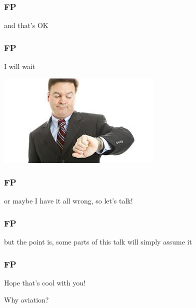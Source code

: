 \begin{frame}
\frametitle{FP}
\begin{center}
and that's OK
\end{center}
\end{frame}

\begin{frame}
\frametitle{FP}
\begin{center}
I will wait

\includegraphics[height=0.1\textheight]{image/man-looking-at-watch.jpg}
\end{center}
\end{frame}

\begin{frame}
\frametitle{FP}
\begin{center}
or maybe I have it all wrong, so let's talk!
\end{center}
\end{frame}

\begin{frame}
\frametitle{FP}
\begin{center}
but the point is, some parts of this talk will simply assume it
\end{center}
\end{frame}

\begin{frame}
\frametitle{FP}
\begin{center}
Hope that's cool with you!
\end{center}
\end{frame}

\begin{frame}
\begin{center}
Why aviation?
\end{center}
\end{frame}

